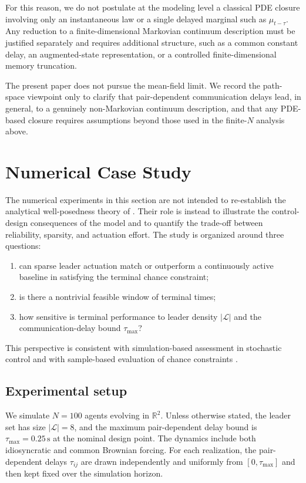 \documentclass[pdflatex,sn-mathphys-num]{sn-jnl}%
\numberwithin{equation}{section}
\theoremstyle{thmstyleone}%
\theoremstyle{remark}
\theoremstyle{definition}
\newcommand{\R}{\mathbb{R}}
\newcommand{\calL}{\mathcal{L}}
\begin{document}
For this reason, we do not postulate at the modeling level a
classical PDE closure involving only an instantaneous law or a single
delayed marginal such as $\mu_{t-\tau}$. Any reduction to a
finite-dimensional Markovian continuum description must be justified
separately and requires additional structure, such as a common constant
delay, an augmented-state representation, or a controlled
finite-dimensional memory truncation.

The present paper does not pursue the mean-field limit. We record the
path-space viewpoint only to clarify that pair-dependent communication
delays lead, in general, to a genuinely non-Markovian continuum
description, and that any PDE-based closure requires assumptions beyond
those used in the finite-$N$ analysis above.
\section{Numerical Case Study}
\label{sec:numerics}

The numerical experiments in this section are not intended to re-establish
the analytical well-posedness theory of
. Their role is instead to
illustrate the control-design consequences of the model and to quantify the
trade-off between reliability, sparsity, and actuation effort. The study is
organized around three questions:
\begin{enumerate}[label=(\roman*),nosep]
\item can sparse leader actuation match or outperform a continuously active
baseline in satisfying the terminal chance constraint;
\item is there a nontrivial feasible window of terminal times;
\item how sensitive is terminal performance to leader density $|\calL|$ and
the communication-delay bound $\tau_{\max}$?
\end{enumerate}
This perspective is consistent with simulation-based assessment in
stochastic control \cite{mesbah2016stochastic} and with sample-based
evaluation of chance constraints \cite{nemirovski2007convex}.

\subsection{Experimental setup}
\label{subsec:num-setup}

We simulate $N=100$ agents evolving in $\R^2$. Unless otherwise stated, the
leader set has size $|\calL|=8$, and the maximum pair-dependent delay bound
is $\tau_{\max}=0.25\,\mathrm{s}$ at the nominal design point. The dynamics
include both idiosyncratic and common Brownian forcing. For each
realization, the pair-dependent delays $\tau_{ij}$ are drawn independently
and uniformly from $[0,\tau_{\max}]$ and then kept fixed over the
simulation horizon.
\end{document}
